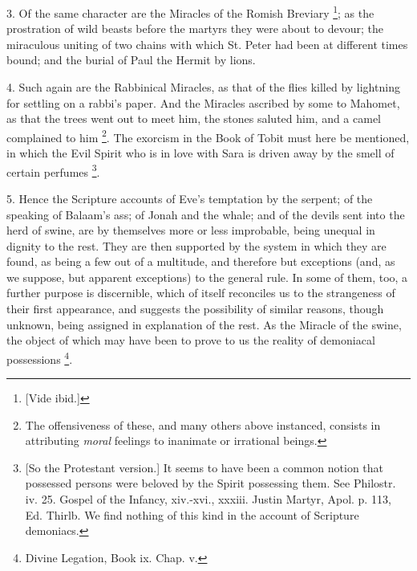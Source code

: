 3. Of the same character are the Miracles of the
Romish Breviary \footnote{[Vide ibid.]}; as the prostration of wild beasts before
the martyrs they were about to devour; the miraculous uniting of two
chains with which St. Peter had been at different times bound; and the
burial of Paul the Hermit by lions.

4. Such again are the Rabbinical Miracles, as
that of the flies killed by lightning for settling on a rabbi's
paper. And the Miracles ascribed by some to Mahomet, as that the trees
went out to meet him, the stones saluted him, and a camel complained
to him \footnote{The offensiveness of these, and many others
above instanced, consists in attributing \emph{moral} feelings to
inanimate or irrational beings.}. The exorcism in the Book of Tobit must here be
mentioned, in which the Evil Spirit who is in love with Sara is driven
away by the smell of certain perfumes \footnote{[So the Protestant version.] It seems to have
been a common notion that possessed persons were beloved by the Spirit
possessing them. See Philostr. iv. 25. Gospel of the Infancy,
xiv.-xvi., xxxiii. Justin Martyr, Apol. p. 113, Ed. Thirlb. We find
nothing of this kind in the account of Scripture demoniacs.}.

5. Hence the Scripture accounts of Eve's
temptation by the serpent; of the speaking of Balaam's ass; of Jonah
and the whale; and of the devils sent into the herd of swine, are by
themselves more or less improbable, being unequal in dignity to the
rest. They are then supported by the system in which they are found,
as being a few out of a multitude, and therefore but exceptions (and,
as we suppose, but apparent exceptions) to the general rule. In some
of them, too, a further purpose is discernible, which of itself
reconciles us to the strangeness of their first appearance, and
suggests the possibility of similar reasons, though unknown, being
assigned in explanation of the rest. As the Miracle of the swine, the
object of which may have been to prove to us the reality of demoniacal
possessions \footnote{Divine Legation, Book ix. Chap. v.}.

